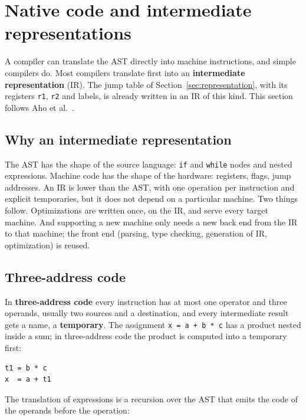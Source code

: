 \section{Native code and intermediate representations}
\label{sec:ir}

A compiler can translate the AST directly into machine instructions, and
simple compilers do. Most compilers translate first into an
\textbf{intermediate representation} (IR). The jump table of
Section~\ref{sec:representation}, with its registers \texttt{r1}, \texttt{r2}
and labels, is already written in an IR of this kind. This section follows Aho
et al.~\cite[Ch.~6, 8]{aho2007compilers}.

\subsection{Why an intermediate representation}

The AST has the shape of the source language: \texttt{if} and \texttt{while}
nodes and nested expressions. Machine code has the shape of the hardware:
registers, flags, jump addresses. An IR is lower than the AST, with one
operation per instruction and explicit temporaries, but it does not depend on
a particular machine. Two things follow. Optimizations are written once, on
the IR, and serve every target machine. And supporting a new machine only
needs a new back end from the IR to that machine; the front end (parsing,
type checking, generation of IR, optimization) is reused.

\subsection{Three-address code}

In \textbf{three-address code} every instruction has at most one operator and
three operands, usually two sources and a destination, and every intermediate
result gets a name, a \textbf{temporary}. The assignment
\texttt{x = a + b * c} has a product nested inside a sum; in three-address
code the product is computed into a temporary first:
\begin{lstlisting}
t1 = b * c
x  = a + t1
\end{lstlisting}
The translation of expressions is a recursion over the AST that emits the
code of the operands before the operation:

